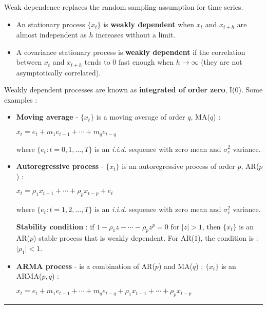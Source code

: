  \begin{f}

Weak dependence replaces the random sampling assumption for time series.

\begin{itemize}[leftmargin=*]
	\item An stationary process \(\lbrace x_{t} \rbrace\) is \textbf{weakly dependent} when \(x_{t}\) and \(x_{t + h}\) are almost independent as \(h\) increases without a limit.
	\item A covariance stationary process is \textbf{weakly dependent} if the correlation between \(x_{t}\) and \(x_{t + h}\) tends to \(0\) fast enough when \(h \rightarrow \infty\) (they are not asymptotically correlated).
\end{itemize}

Weakly dependent processes are known as \textbf{integrated of order zero}, I(0). Some examples :

\begin{itemize}[leftmargin=*]
\item \textbf{Moving average} - \(\lbrace x_{t} \rbrace\) is a moving average of order \(q\), MA(\(q\)) :

\begin{center}
	\(x_{t} = e_{t} + m_{1} e_{t - 1} + \cdots + m_{q} e_{t - q}\)
\end{center}

where \(\lbrace e_{t} : t = 0, 1, \ldots, T \rbrace\) is an \textsl{i.i.d.} sequence with zero mean and \(\sigma^{2}_{e}\) variance.

\item \textbf{Autoregressive process} - \(\lbrace x_{t} \rbrace\) is an autoregressive process of order \(p\), AR(\(p\)) :

\begin{center}
	\(x_{t} = \rho_{1} x_{t - 1} + \cdots + \rho_{p} x_{t - p} + e_{t}\)
\end{center}

where \(\lbrace e_{t} : t = 1, 2, \ldots, T \rbrace\) is an \textsl{i.i.d.} sequence with zero mean and \(\sigma^{2}_{e}\) variance.

\textbf{Stability condition} : if \(1 - \rho_{1} z - \cdots - \rho_{p} z^{p} = 0\) for \(\lvert z \rvert > 1\), then \(\lbrace x_{t} \rbrace\) is an AR(\(p\)) stable process that is weakly dependent. For AR(1), the condition is : \(\lvert \rho_{1} \rvert < 1\).

\item \textbf{ARMA process} - is a combination of AR(\(p\)) and MA(\(q\)) ; \(\lbrace x_{t} \rbrace\) is an ARMA(\(p, q\)) :

\begin{center}
	\(x_{t} = e_{t} + m_{1} e_{t - 1} + \cdots + m_{q} e_{t - q} + \rho_{1} x_{t - 1} + \cdots + \rho_{p} x_{t - p}\)
\end{center}
\end{itemize}


		\end{f}  \hrule

